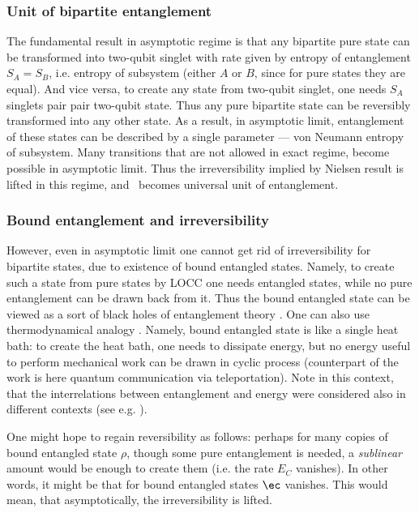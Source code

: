 \documentclass[twocolumn,aps,rmp]{revtex4}
\begin{document}
\subsubsection{Unit of bipartite entanglement}
The fundamental result in asymptotic regime is that any
bipartite pure state can be transformed into  two-qubit
singlet with rate given by entropy of entanglement $S_A=S_B$, i.e.
entropy of subsystem (either $A$ or $B$, since for pure states they
are equal). And vice versa, to create any state from  two-qubit
singlet, one needs $S_A$ singlets pair pair two-qubit
state. Thus any pure bipartite state can be reversibly transformed
into any other state. As a result, in asymptotic limit, entanglement
of these states can be described by a single parameter --- von Neumann
entropy of subsystem. Many transitions that are not allowed in exact
regime, become possible in asymptotic limit. Thus the
irreversibility implied by Nielsen result is lifted in this regime,
and \eprstate\ becomes universal unit of entanglement.

\subsubsection{Bound entanglement  and irreversibility}
However, even in asymptotic limit one cannot get rid of
irreversibility for bipartite states, due to existence of bound
entangled states.
Namely, to create such a state from pure states by LOCC one needs
entangled states, while no pure entanglement can be drawn back from
it. Thus the bound entangled state can be viewed as a sort of
black holes of entanglement theory \cite{Terhal-PhysTod}. One can
also use thermodynamical analogy \cite{termo,thermo-ent2002}. Namely,
bound entangled state is like a single heat bath: to create the heat
bath, one needs to dissipate energy, but no energy useful to perform
mechanical work can be drawn in cyclic process (counterpart of the work is here
quantum communication via teleportation). Note in this context, that
the interrelations between entanglement and energy were considered also in different
contexts (see e.g. \cite{balance,OsborneN,HughZB-ener-ent}).

One might hope to regain reversibility as follows: perhaps for many
copies of bound entangled  state $\rho$, though some pure
entanglement is needed, a {\it sublinear} amount would be
enough to create them (i.e. the rate $E_C$ vanishes). In other
words, it might be that for bound entangled states $\ec$ vanishes.
This would mean, that asymptotically, the irreversibility is lifted.
\end{document}
